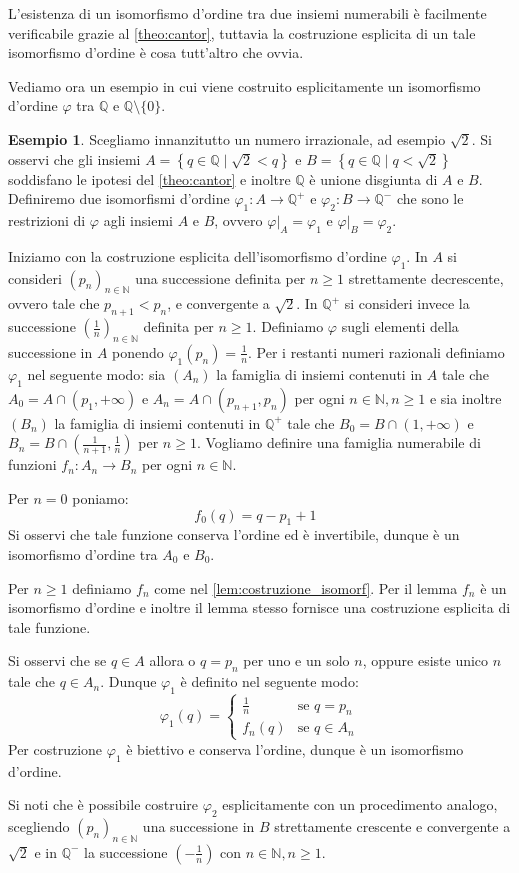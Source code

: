 \documentclass[12pt,a4paper,openright]{report}
\newcommand{\Q}{\mathbb{Q}} %
\newcommand{\0}{\setminus\{0\}} %
\theoremstyle{definition}
\newtheorem{es}[defn]{Esempio}
\theoremstyle{plain}
\begin{document}
L'esistenza di un isomorfismo d'ordine tra due insiemi numerabili è facilmente verificabile grazie al \cref{theo:cantor}, tuttavia la costruzione esplicita di un tale isomorfismo d'ordine è cosa tutt'altro che ovvia.

Vediamo ora un esempio in cui viene costruito esplicitamente un isomorfismo d'ordine $\varphi$ tra $\Q$ e $\Q\0$.
\begin{es} 
    Scegliamo innanzitutto un numero irrazionale, ad esempio $\sqrt{2}$. Si osservi che gli insiemi $A=\left\{q \in \Q \mid \sqrt{2}<q\right\}$ e $B=\left\{q \in \Q \mid q<\sqrt{2}\right\}$ soddisfano le ipotesi del \cref{theo:cantor} e inoltre $\Q$ è unione disgiunta di $A$ e $B$. Definiremo due isomorfismi d'ordine $\varphi_1:A \rightarrow \Q^+$ e $\varphi_2:B \rightarrow \Q^-$ che sono le restrizioni di $\varphi$ agli insiemi $A$ e $B$, ovvero $\varphi |_A = \varphi_1$ e $\varphi |_B = \varphi_2$.

    Iniziamo con la costruzione esplicita dell'isomorfismo d'ordine $\varphi_1$.
    In $A$ si consideri $(p_n)_{n \in \mathbb{N}}$ una successione definita per $n \geq 1$ strettamente decrescente, ovvero tale che $p_{n+1}<p_{n}$, e convergente a $\sqrt{2}$. In $\Q^+$ si consideri invece la successione $\left(\frac{1}{n}\right)_{n \in \mathbb{N}}$ definita per $n \geq 1$.
    Definiamo $\varphi$ sugli elementi della successione in $A$ ponendo $\varphi_1(p_n)=\frac{1}{n}$.
    Per i restanti numeri razionali definiamo $\varphi_1$ nel seguente modo: sia $(A_n)$ la famiglia di insiemi contenuti in $A$ tale che $A_0=A \cap (p_1,+\infty)$ e $A_n=A \cap (p_{n+1},p_n)$ per ogni $n \in \mathbb{N}, n\geq 1$ e sia inoltre $(B_n)$ la famiglia di insiemi contenuti in $\Q^+$ tale che $B_0=B \cap (1,+\infty)$ e $B_n=B \cap (\frac{1}{n+1},\frac{1}{n})$ per $n \geq 1$.
    Vogliamo definire una famiglia numerabile di funzioni $f_n:A_n \rightarrow B_n$ per ogni $n \in\mathbb{N}$.

    Per $n=0$ poniamo: \[f_0(q)=q-p_1+1 \mbox{ }\] Si osservi che tale funzione conserva l'ordine ed è invertibile, dunque è un isomorfismo d'ordine tra $A_0$ e $B_0$.

    Per $n \geq 1$ definiamo $f_n$ come nel \cref{lem:costruzione_isomorf}. Per il lemma $f_n$ è un isomorfismo d'ordine e inoltre il lemma stesso fornisce una costruzione esplicita di tale funzione.

    Si osservi che se $q \in A$ allora o $q=p_n$ per uno e un solo $n$, oppure esiste unico $n$ tale che $q \in A_n$.
    Dunque $\varphi_1$ è definito nel seguente modo:
    \[\varphi_1(q)=
    \begin{cases} 
    \frac{1}{n} & \mbox{se } q=p_n \\ 
    f_n(q) & \mbox{se } q \in A_n   
  \end{cases}\]
   Per costruzione $\varphi_1$ è biettivo e conserva l'ordine, dunque è un isomorfismo d'ordine.

   Si noti che è possibile costruire $\varphi_2$ esplicitamente con un procedimento analogo, scegliendo $(p_n)_{n \in \mathbb{N}}$ una successione in $B$ strettamente crescente e convergente a $\sqrt{2}$ e in $\Q^-$ la successione $\left(-\frac{1}{n}\right)$ con $n \in \mathbb{N},n \geq 1$.
\end{es}
\end{document}
